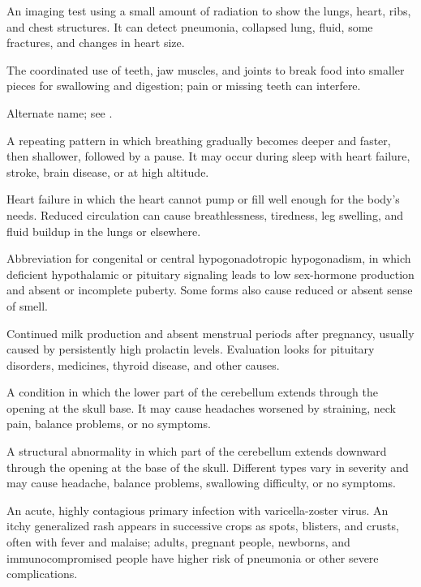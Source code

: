  An imaging test using a small amount of radiation to show the lungs, heart, ribs, and chest structures. It can detect pneumonia, collapsed lung, fluid, some fractures, and changes in heart size.

 The coordinated use of teeth, jaw muscles, and joints to break food into smaller pieces for swallowing and digestion; pain or missing teeth can interfere.

 Alternate name; see .

 A repeating pattern in which breathing gradually becomes deeper and faster, then shallower, followed by a pause. It may occur during sleep with heart failure, stroke, brain disease, or at high altitude.

 Heart failure in which the heart cannot pump or fill well enough for the body's needs. Reduced circulation can cause breathlessness, tiredness, leg swelling, and fluid buildup in the lungs or elsewhere.

 Abbreviation for congenital or central hypogonadotropic hypogonadism, in which deficient hypothalamic or pituitary signaling leads to low sex-hormone production and absent or incomplete puberty. Some forms also cause reduced or absent sense of smell.

 Continued milk production and absent menstrual periods after pregnancy, usually caused by persistently high prolactin levels. Evaluation looks for pituitary disorders, medicines, thyroid disease, and other causes.

 A condition in which the lower part of the cerebellum extends through the opening at the skull base. It may cause headaches worsened by straining, neck pain, balance problems, or no symptoms.

 A structural abnormality in which part of the cerebellum extends downward through the opening at the base of the skull. Different types vary in severity and may cause headache, balance problems, swallowing difficulty, or no symptoms.

 An acute, highly contagious primary infection with varicella-zoster virus. An itchy generalized rash appears in successive crops as spots, blisters, and crusts, often with fever and malaise; adults, pregnant people, newborns, and immunocompromised people have higher risk of pneumonia or other severe complications.


